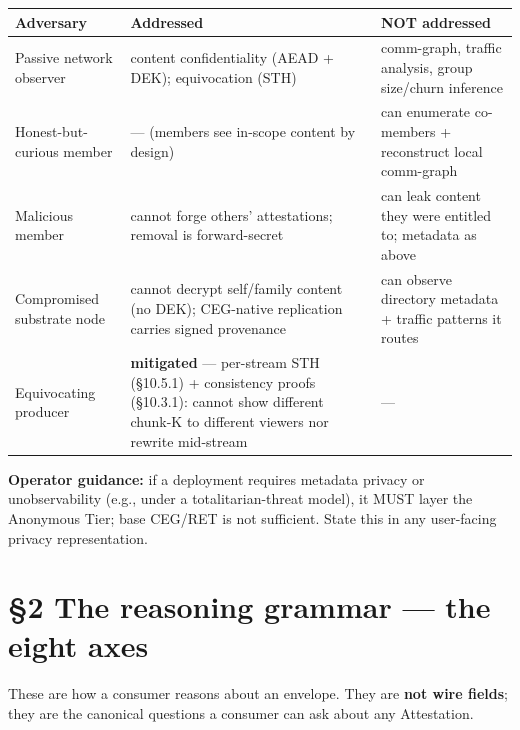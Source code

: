 \documentclass[11pt]{article}
\begin{document}
{\footnotesize
\begin{longtable}{|p{5.33cm}|p{5.33cm}|p{5.33cm}|}\hline
\textbf{Adversary} & \textbf{Addressed} & \textbf{NOT addressed} \\ \hline\endhead
Passive network observer & content confidentiality (AEAD + DEK); equivocation (STH) & comm-graph, traffic analysis, group size/churn inference \\ \hline
Honest-but-curious member & — (members see in-scope content by design) & can enumerate co-members + reconstruct local comm-graph \\ \hline
Malicious member & cannot forge others' attestations; removal is forward-secret & can leak content they were entitled to; metadata as above \\ \hline
Compromised substrate node & cannot decrypt self/family content (no DEK); CEG-native replication carries signed provenance & can observe directory metadata + traffic patterns it routes \\ \hline
Equivocating producer & \textbf{mitigated} — per-stream STH (§10.5.1) + consistency proofs (§10.3.1): cannot show different chunk-K to different viewers nor rewrite mid-stream & — \\ \hline
\end{longtable}}


\textbf{Operator guidance:} if a deployment requires metadata privacy or unobservability (e.g., under a totalitarian-threat model), it MUST layer the Anonymous Tier; base CEG/RET is not sufficient. State this in any user-facing privacy representation.




\clearpage


\section*{§2 The reasoning grammar — the eight axes}


These are how a consumer reasons about an envelope. They are \textbf{not wire fields}; they are the canonical questions a consumer can ask about any Attestation.
\end{document}
